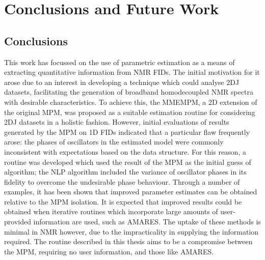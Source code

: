 \chapter{Conclusions and Future Work}
\label{chap:conclusions}

\section{Conclusions}
This work has focussed on the use of parametric estimation as a means of
extracting quantitative information from \ac{NMR} \acp{FID}. The initial
motivation for it arose due to an interest in developing a technique
which could analyse \ac{2DJ} datasets, facilitating the generation of broadband
homodecoupled \ac{NMR} spectra with desirable characteristics.
To achieve this, the \ac{MMEMPM}, a \ac{2D} extension of the original \ac{MPM},
was proposed as a suitable estimation routine for considering \ac{2DJ} datasets
in a holistic fashion.
However, initial evaluations of results generated by the \ac{MPM} on
\ac{1D} \acp{FID} indicated that a particular flaw frequently arose: the phases
of oscillators in the estimated model were commonly inconsistent with
expectations based on the data structure.
For this reason, a routine was developed which used the result of the
\ac{MPM} as the initial guess of  algorithm; the \ac{NLP} algorithm
included the variance of oscillator phases in its fidelity to overcome the
undesirable phase behaviour.
Through a number of examples, it has been shown that improved parameter
estimates can be obtained relative to the \ac{MPM} isolation.
It is expected that improved results could be obtained when iterative routines
which incorporate large amounts of user-provided information are used, such as
\ac{AMARES}. The uptake of these methods is minimal in \ac{NMR} however, due to
the impracticality in supplying the information required. The routine described
in this thesis aims to be a compromise between the \ac{MPM}, requiring no user
information, and those like \ac{AMARES}.

